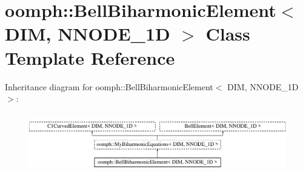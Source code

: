 \hypertarget{classoomph_1_1BellBiharmonicElement}{}\section{oomph\+:\+:Bell\+Biharmonic\+Element$<$ D\+IM, N\+N\+O\+D\+E\+\_\+1D $>$ Class Template Reference}
\label{classoomph_1_1BellBiharmonicElement}
Inheritance diagram for oomph\+:\+:Bell\+Biharmonic\+Element$<$ D\+IM, N\+N\+O\+D\+E\+\_\+1D $>$\+:\begin{figure}[H]
\begin{center}
\leavevmode
\includegraphics[height=2.608696cm]{classoomph_1_1BellBiharmonicElement}
\end{center}
\end{figure}
